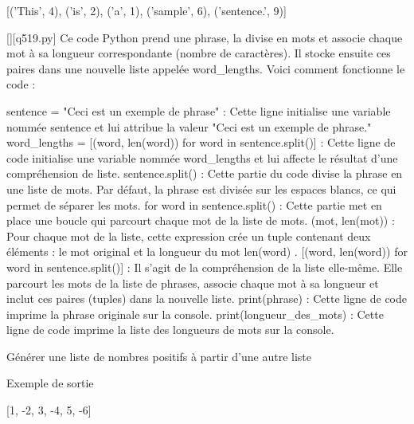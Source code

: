 [('This', 4), ('is', 2), ('a', 1), ('sample', 6), ('sentence.', 9)]
        \par
        \begin{solution}
            \renewcommand{\nomfichier}{q519.py}
            \pythonfile{\chemincode \nomfichier}[][\nomfichier]
            Ce code Python prend une phrase, la divise en mots et associe chaque mot à sa longueur correspondante (nombre de caractères). Il stocke ensuite ces paires dans une nouvelle liste appelée word_lengths. Voici comment fonctionne le code :

    sentence = "Ceci est un exemple de phrase" : Cette ligne initialise une variable nommée sentence et lui attribue la valeur "Ceci est un exemple de phrase."
    word_lengths = [(word, len(word)) for word in sentence.split()] : Cette ligne de code initialise une variable nommée word_lengths et lui affecte le résultat d'une compréhension de liste.
        sentence.split() : Cette partie du code divise la phrase en une liste de mots. Par défaut, la phrase est divisée sur les espaces blancs, ce qui permet de séparer les mots.
        for word in sentence.split() : Cette partie met en place une boucle qui parcourt chaque mot de la liste de mots.
        (mot, len(mot)) : Pour chaque mot de la liste, cette expression crée un tuple contenant deux éléments : le mot original et la longueur du mot len(word) .
        [(word, len(word)) for word in sentence.split()] : Il s'agit de la compréhension de la liste elle-même. Elle parcourt les mots de la liste de phrases, associe chaque mot à sa longueur et inclut ces paires (tuples) dans la nouvelle liste.
    print(phrase) : Cette ligne de code imprime la phrase originale sur la console.
    print(longueur_des_mots) : Cette ligne de code imprime la liste des longueurs de mots sur la console.
        \end{solution}
        

        \question
        Générer une liste de nombres positifs à partir d'une autre liste

Exemple de sortie

[1, -2, 3, -4, 5, -6]

